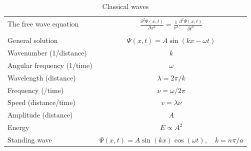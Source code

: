 \documentclass[11pt]{article}
\begin{document}
\begin{table}
\begin{center}
    \caption{Classical waves}
    \begin{tabular}{|lc|}
     \hline
The free wave equation & $\displaystyle \frac{ \partial^2 \Psi(x,t)}{\partial x^2} = \frac{1}{v^2}\frac{\partial^2 \Psi(x,t)}{\partial t^2}$ \\
\\
General solution & \(\Psi(x,t) = A \sin(kx -\omega t)\) \\
Wavenumber (1/distance) & \(k\) \\
Angular frequency (1/time) & \(\omega\) \\
Wavelength (distance) & \( \lambda = 2\pi/k \) \\
Frequency (/time) & \( \nu =\omega/2\pi \) \\
Speed (distance/time) & \( v= \lambda \nu \) \\
Amplitude (distance) & \(A\) \\
Energy & \( E \propto A^2 \) \\
Standing wave & \(\Psi(x,t) = A \sin(kx)\cos(\omega t), \quad k =n\pi/a\) \\
\hline
\end{tabular}
\end{center}
\end{table}
\end{document}
